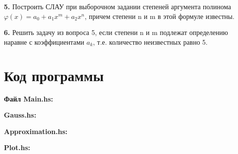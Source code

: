 \documentclass[a4paper,12pt]{article}
\begin{document}
\noindent\textbf{5.} Построить СЛАУ при выборочном задании степеней аргумента полинома $\varphi(x) = a_{0} + a_{1}x^m + a_{2}x^n$, причем степени n и m в этой формуле известны. \newline

\noindent\textbf{6.} Решить задачу из вопроса 5, если степени n и m подлежат определению наравне с коэффициентами $a_{k}$, т.е. количество неизвестных равно 5. \newline

\clearpage
\section{Код программы}
\noindent\textbf{Файл Main.hs:}


\noindent\textbf{ Gauss.hs:}


\noindent\textbf{ Approximation.hs:}


\noindent\textbf{ Plot.hs:}

\end{document}

